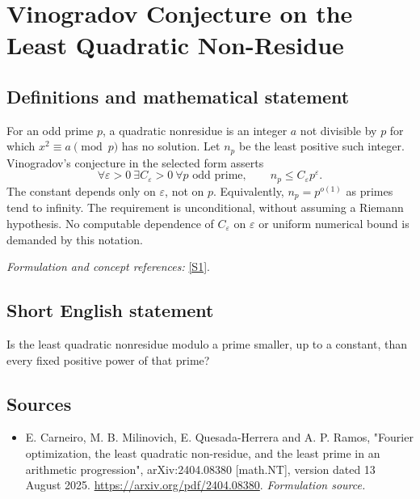 \documentclass[11pt]{article}
\begin{document}
\section*{\texorpdfstring{Vinogradov Conjecture on the Least Quadratic Non-Residue}{Vinogradov Conjecture on the Least Quadratic Non-Residue}}\label{356}
\subsection{Definitions and mathematical statement}
For an odd prime $p$, a quadratic nonresidue is an integer $a$ not divisible by $p$ for which $x^2\equiv a\pmod p$ has no solution. Let $n_p$ be the least positive such integer. Vinogradov's conjecture in the selected form asserts
\[
 \forall{\varepsilon}>0\ \exists C_{\varepsilon}>0\ \forall p\text{ odd prime},
 \qquad n_p\le C_{\varepsilon} p^{\varepsilon}.
\]
The constant depends only on ${\varepsilon}$, not on $p$. Equivalently, $n_p=p^{o(1)}$ as primes tend to infinity. The requirement is unconditional, without assuming a Riemann hypothesis. No computable dependence of $C_{\varepsilon}$ on ${\varepsilon}$ or uniform numerical bound is demanded by this notation.
\par\smallskip\textit{Formulation and concept references:} \href{https://arxiv.org/pdf/2404.08380}{[S1]}.

\subsection{Short English statement}
Is the least quadratic nonresidue modulo a prime smaller, up to a constant, than every fixed positive power of that prime?
\subsection{Sources}
\begin{itemize}
\item[S1]E. Carneiro, M. B. Milinovich, E. Quesada-Herrera and A. P. Ramos, "Fourier optimization, the least quadratic non-residue, and the least prime in an arithmetic progression", arXiv:2404.08380 [math.NT], version dated 13 August 2025.
\url{https://arxiv.org/pdf/2404.08380}.
\textit{Formulation source.}
\end{itemize}
\end{document}
